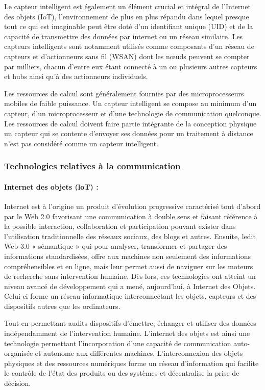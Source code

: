 Le capteur intelligent est également un élément crucial et intégral de l’Internet des objets (IoT), l’environnement de plus en plus répandu dans lequel presque tout ce qui est imaginable peut être doté d’un identifiant unique (UID) et de la capacité de transmettre des données par internet ou un réseau similaire. Les capteurs intelligents sont notamment utilisés comme composants d’un réseau de capteurs et d’actionneurs sans fil (WSAN) dont les nœuds peuvent se compter par milliers, chacun d’entre eux étant connecté à un ou plusieurs autres capteurs et hubs ainsi qu’à des actionneurs individuels.

Les ressources de calcul sont généralement fournies par des microprocesseurs mobiles de faible puissance. Un capteur intelligent se compose au minimum d’un capteur, d’un microprocesseur et d’une technologie de communication quelconque. Les ressources de calcul doivent faire partie intégrante de la conception physique un capteur qui se contente d’envoyer ses données pour un traitement à distance n’est pas considéré comme un capteur intelligent\cite{CapteurIntelligent2020}.

\subsubsection{Technologies relatives à la communication}
\paragraph{Internet des objets (loT) :}
Internet est à l'origine un produit d'évolution progressive caractérisé tout d'abord par le Web 2.0 favorisant une communication à double sens et faisant référence à la possible interaction, collaboration et participation pouvant exister dans l'utilisation traditionnelle des réseaux sociaux, des blogs et autres. Ensuite, ledit Web 3.0 « sémantique » qui pour analyser, transformer et partager des informations standardisées, offre aux machines non seulement des informations compréhensibles et en ligne, mais leur permet aussi de naviguer sur les moteurs de recherche sans intervention humaine. Dès lors, ces technologies ont atteint un niveau avancé de développement qui a mené, aujourd'hui, à Internet des Objets. Celui-ci forme un réseau informatique interconnectant les objets, capteurs et des dispositifs autres que les ordinateurs. 

Tout en permettant audits dispositifs d'émettre, échanger et utiliser des données indépendamment de l'intervention humaine. L'internet des objets est ainsi une technologie permettant l'incorporation d'une capacité de communication auto-organisée et autonome aux différentes machines. L'interconnexion des objets physiques et des ressources numériques forme un réseau d'information qui facilite le contrôle de l'état des produits ou des systèmes et décentralise la prise de décision.

